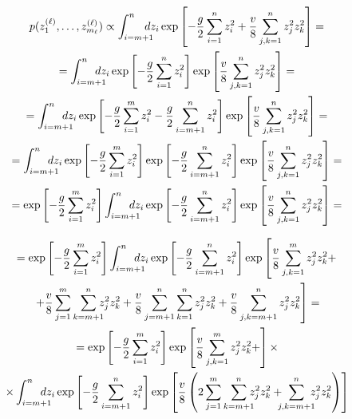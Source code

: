 \documentclass{beamer}
\def\eell{{(\ell)}}
\begin{document}
\begin{frame}

	\small
	\begin{multline*}
		 p(z_1^\eell, \ldots, z_{m_\ell}^\eell ) \propto \int_{i=m+1}^{n}\hspace{-10pt} dz_i \exp\left[-\frac{g}{2}\sum_{i=1}^{n}  z_i^2 + \frac{v}{8}\sum_{j,k=1}^{n}  z_j^2 z_k^2\right]=\\ 
		 = \int_{i=m+1}^{n}\hspace{-12pt} dz_i \exp\left[-\frac{g}{2}\sum_{i=1}^{n}  z_i^2 \right] \exp\left[ \frac{v}{8}\sum_{j,k=1}^{n}  z_j^2 z_k^2\right]=\\ = \int_{i=m+1}^{n}\hspace{-12pt} dz_i \exp\left[-\frac{g}{2}\sum_{i=1}^{m}  z_i^2 -\frac{g}{2}\sum_{i=m+1}^{n}  z_i^2 \right] \exp\left[ \frac{v}{8}\sum_{j,k=1}^{n}  z_j^2 z_k^2\right]=\\
		  = \int_{i=m+1}^{n}\hspace{-12pt} dz_i \exp\left[-\frac{g}{2}\sum_{i=1}^{m}  z_i^2 \right]\exp\left[ -\frac{g}{2}\sum_{i=m+1}^{n}  z_i^2 \right] \exp\left[ \frac{v}{8}\sum_{j,k=1}^{n}  z_j^2 z_k^2\right]=\\ 
		   = \exp\left[-\frac{g}{2}\sum_{i=1}^{m}  z_i^2 \right]\int_{i=m+1}^{n}\hspace{-12pt} dz_i \exp\left[ -\frac{g}{2}\sum_{i=m+1}^{n}  z_i^2 \right] \exp\left[ \frac{v}{8}\sum_{j,k=1}^{n}  z_j^2 z_k^2\right]=\\ 
	\end{multline*}
\end{frame}

\begin{frame}
	\small
	\begin{multline*}
		= \exp\left[-\frac{g}{2}\sum_{i=1}^{m}  z_i^2 \right]\int_{i=m+1}^{n}\hspace{-12pt} dz_i \exp\left[ -\frac{g}{2}\sum_{i=m+1}^{n}  z_i^2 \right] \exp\left[ \frac{v}{8}\sum_{j,k=1}^{m}  z_j^2z_k^2 + \right.\\ %
		\left. + \frac{v}{8}\sum_{j=1}^{m}\sum_{k=m+1}^{n} \hspace*{-6pt}z_j^2z_k^2 +\frac{v}{8}\sum_{j=m+1}^{n}\sum_{k=1}^{n}z_j^2z_k^2  + \frac{v}{8}\sum_{j,k=m+1}^{n}  z_j^2 z_k^2\right]=\\ %
		= \exp\left[-\frac{g}{2}\sum_{i=1}^{m}  z_i^2 \right] \exp\left[ \frac{v}{8}\sum_{j,k=1}^{m}  z_j^2z_k^2 + \right]\times \\
		\times \int_{i=m+1}^{n}\hspace{-12pt} dz_i \exp\left[ -\frac{g}{2}\sum_{i=m+1}^{n}  z_i^2 \right] 
		\exp\left[ \frac{v}{8}\left(2\sum_{j=1}^{m}\sum_{k=m+1}^{n} \hspace*{-6pt}z_j^2z_k^2 + \hspace{-6pt}\sum_{j,k=m+1}^{n} \hspace{-6pt} z_j^2 z_k^2  \right)  \right]
	\end{multline*}
\end{frame}
\end{document}
